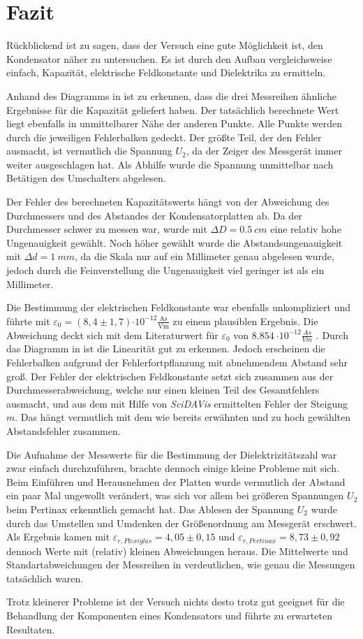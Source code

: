 \chapter{Fazit}
Rückblickend ist zu sagen, dass der Versuch eine gute Möglichkeit ist, den Kondensator näher zu untersuchen. Es ist durch
den Aufbau vergleichsweise einfach, Kapazität, elektrische Feldkonstante und Dielektrika zu ermitteln.\par
Anhand des Diagramms in  ist zu erkennen, dass die drei Messreihen ähnliche Ergebnisse für die Kapazität
geliefert haben. Der tatsächlich berechnete Wert liegt ebenfalls in unmittelbarer Nähe der anderen Punkte. Alle Punkte
werden durch die jeweiligen Fehlerbalken gedeckt. Der größte Teil, der den Fehler ausmacht, ist vermutlich die Spannung
$ U_{2} $, da der Zeiger des Messgerät immer weiter ausgeschlagen hat. Als Abhilfe wurde die Spannung unmittelbar nach
Betätigen des Umschalters abgelesen.\par
Der Fehler des berechneten Kapazitätswerts hängt von der Abweichung des Durchmessers und des Abstandes der Kondensatorplatten
ab. Da der Durchmesser schwer zu messen war, wurde mit $ \Delta D=\SI{0,5}{cm} $ eine relativ hohe Ungenauigkeit gewählt.
Noch höher gewählt wurde die Abstandsungenauigkeit mit $ \Delta d=\SI{1}{mm} $, da die Skala nur auf ein Millimeter genau
abgelesen wurde, jedoch durch die Feinverstellung die Ungenauigkeit viel geringer ist als ein Millimeter.\par
Die Bestimmung der elektrischen Feldkonstante war ebenfalls unkompliziert und führte mit
$ \varepsilon_{0}=(8,4\pm 1,7){\cdot 10^{-12}\frac{\text{As}}{\text{Vm}}} $ zu einem plausiblen Ergebnis. Die Abweichung
deckt sich mit dem Literaturwert für \(\varepsilon_0\) von \( \SI{8,854}{\cdot 10^{-12} \frac{As}{Vm}}\) \cite{Haberle.2007}.
Durch das
Diagramm in  ist die Linearität gut zu erkennen. Jedoch erscheinen die Fehlerbalken aufgrund der Fehlerfortpflanzung
mit abnehmendem Abstand sehr groß. Der Fehler der elektrischen Feldkonstante setzt sich zusammen aus der Durchmesserabweichung,
welche nur einen kleinen Teil des Gesamtfehlers ausmacht, und aus dem mit Hilfe von \textit{SciDAVis} ermittelten Fehler
der Steigung \(m\).
Das hängt vermutlich mit dem wie bereits erwähnten und zu hoch gewählten Abstandsfehler zusammen.\par
Die Aufnahme der Messwerte für die Bestimmung der Dielektrizitätszahl war zwar einfach durchzuführen, brachte dennoch einige
kleine Probleme mit sich. Beim Einführen und Herausnehmen der Platten wurde vermutlich der Abstand ein paar Mal
ungewollt verändert, was sich vor allem bei größeren Spannungen $ U_{2} $ beim Pertinax erkenntlich gemacht hat. Das
Ablesen der Spannung $ U_{2} $ wurde durch das Umstellen und Umdenken der Größenordnung am Messgerät erschwert. Als
Ergebnis kamen mit $ \varepsilon_{r,Plexiglas}=4,05\pm 0,15 $ und $ \varepsilon_{r,Pertinax}=8,73\pm 0,92 $ dennoch
Werte mit (relativ) kleinen Abweichungen heraus. Die Mittelwerte und Standartabweichungen der Messreihen in 
verdeutlichen, wie genau die Messungen tatsächlich waren.\par
Trotz kleinerer Probleme ist der Versuch nichts desto trotz gut geeignet für die Behandlung der Komponenten eines
Kondensators und führte zu erwarteten Resultaten.